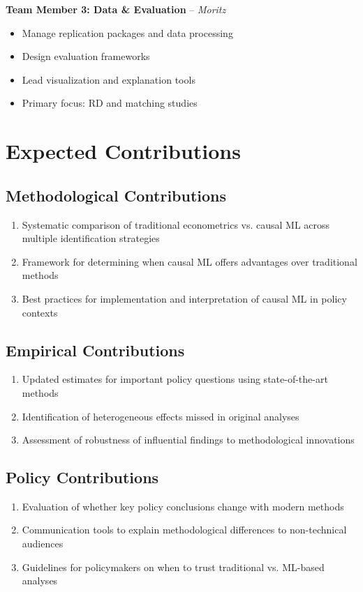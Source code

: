 \documentclass[12pt,a4paper]{article}
\begin{document}
\textbf{Team Member 3: Data \& Evaluation} -- \textit{Moritz}
\begin{itemize}
    \item Manage replication packages and data processing
    \item Design evaluation frameworks
    \item Lead visualization and explanation tools
    \item Primary focus: RD and matching studies
\end{itemize}

\section{Expected Contributions}

\subsection{Methodological Contributions}
\begin{enumerate}
    \item Systematic comparison of traditional econometrics vs. causal ML across multiple identification strategies
    \item Framework for determining when causal ML offers advantages over traditional methods
    \item Best practices for implementation and interpretation of causal ML in policy contexts
\end{enumerate}

\subsection{Empirical Contributions}
\begin{enumerate}
    \item Updated estimates for important policy questions using state-of-the-art methods
    \item Identification of heterogeneous effects missed in original analyses
    \item Assessment of robustness of influential findings to methodological innovations
\end{enumerate}

\subsection{Policy Contributions}
\begin{enumerate}
    \item Evaluation of whether key policy conclusions change with modern methods
    \item Communication tools to explain methodological differences to non-technical audiences
    \item Guidelines for policymakers on when to trust traditional vs. ML-based analyses
\end{enumerate}
\end{document}
